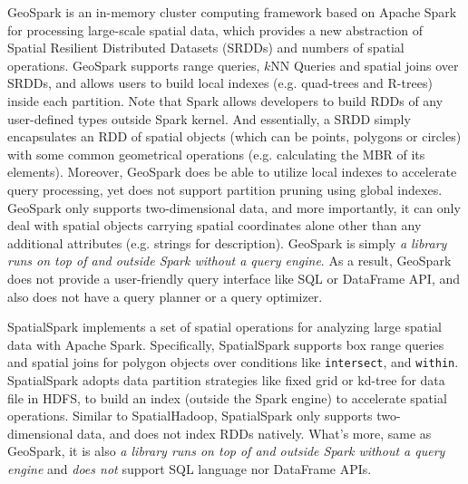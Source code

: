  GeoSpark \cite{geospark} is an in-memory cluster
computing framework based on Apache Spark for processing large-scale
spatial data, which provides a new abstraction of Spatial Resilient
Distributed Datasets (SRDDs) and numbers of spatial operations. GeoSpark
supports range queries, $k$NN Queries and spatial joins over SRDDs, and
allows users to build local indexes (e.g. quad-trees and R-trees) inside
each partition. Note that Spark allows developers to build RDDs of any
user-defined types outside Spark kernel. And essentially, a SRDD simply
encapsulates an RDD of spatial objects (which can be points, polygons
or circles) with some common geometrical operations (e.g. calculating
the MBR of its elements). Moreover, GeoSpark does be able to utilize local
indexes to accelerate query processing, yet does not support partition pruning
using global indexes. GeoSpark only supports two-dimensional data, and more
importantly, it can only deal with spatial objects carrying spatial coordinates
alone other than any additional attributes (e.g. strings for description). GeoSpark
is simply {\em a library runs on top of and outside Spark without a query engine}.
As a result, GeoSpark does not provide a user-friendly query interface
like SQL or DataFrame API, and also does not have a query planner or
a query optimizer.

 SpatialSpark \cite{spatialspark} implements
a set of spatial operations for analyzing large spatial data with
Apache Spark. Specifically, SpatialSpark supports box range queries
and spatial joins for polygon objects over conditions like \texttt{intersect},
and \texttt{within}. SpatialSpark adopts data partition strategies like
fixed grid or kd-tree for data file in HDFS, to build an index (outside the
Spark engine) to accelerate spatial operations. Similar to SpatialHadoop,
SpatialSpark only supports two-dimensional data, and does not index RDDs
natively. What's more, same as GeoSpark, it is also {\em a library runs on
top of and outside Spark without a query engine} and {\em does not} support
SQL language nor DataFrame APIs.



